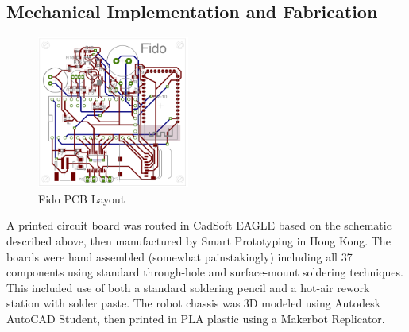 \subsection{Mechanical Implementation and Fabrication}

\begin{figure}[ht]
	\centering
	\includegraphics[height=5cm]{Figures/boardLayout.png}
	\caption{Fido PCB Layout}
\end{figure}


A printed circuit board was routed in CadSoft EAGLE based on the schematic described above, then manufactured by Smart Prototyping in Hong Kong.  The boards were hand assembled (somewhat painstakingly) including all 37 components using standard through-hole and surface-mount soldering techniques.  This included use of both a standard soldering pencil and a hot-air rework station with solder paste.  The robot chassis was 3D modeled using Autodesk AutoCAD Student, then printed in PLA plastic using a Makerbot Replicator.